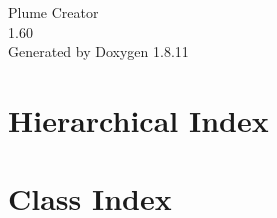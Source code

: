 \documentclass[twoside]{book}
\newcommand{\+}{\discretionary{\mbox{\scriptsize$\hookleftarrow$}}{}{}}
\newcommand{\clearemptydoublepage}{%
  \newpage{\pagestyle{empty}\cleardoublepage}%
}
\begin{document}
\hypersetup{pageanchor=false,
             bookmarksnumbered=true,
             pdfencoding=unicode
            }
\begin{titlepage}
\vspace*{7cm}
\begin{center}%
{\Large Plume Creator \\[1ex]\large 1.\+60 }\\
\vspace*{1cm}
{\large Generated by Doxygen 1.8.11}\\
\end{center}
\end{titlepage}
\clearemptydoublepage
\tableofcontents
\clearemptydoublepage
{}
\hypersetup{pageanchor=true}

\chapter{Hierarchical Index}

\chapter{Class Index}

\end{document}
